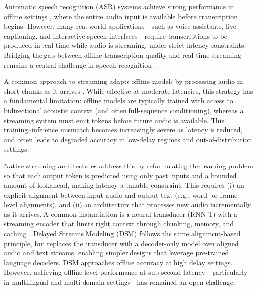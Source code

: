 Automatic speech recognition (ASR) systems achieve strong performance in offline settings \citep{radford2023whisper,liu2025voxtral}, where the entire audio input is available before transcription begins. However, many real-world applications—such as voice assistants, live captioning, and interactive speech interfaces—require transcriptions to be produced in real time while audio is streaming, under strict latency constraints. Bridging the gap between offline transcription quality and real-time streaming remains a central challenge in speech recognition \citep{graves2012rnnt,zeghidour2025streaming}.

A common approach to streaming adapts offline models by processing audio in short chunks as it arrives \citep{machacek2023streaming}. While effective at moderate latencies, this strategy has a fundamental limitation: offline models are typically trained with access to bidirectional acoustic context (and often full-sequence conditioning), whereas a streaming system must emit tokens before future audio is available. This training--inference mismatch becomes increasingly severe as latency is reduced, and often leads to degraded accuracy in low-delay regimes and out-of-distribution settings.

 Native streaming architectures address this by reformulating the learning problem so that each output token is predicted using only past inputs and a bounded amount of lookahead, making latency a tunable constraint. This requires (i) an explicit alignment between input audio and output text (e.g., word- or frame-level alignments), and (ii) an architecture that processes new audio incrementally as it arrives. A common instantiation is a neural transducer (RNN-T) with a streaming encoder that limits right context through chunking, memory, and caching \citep{graves2012rnnt,Shi2020EmformerEM, chen2021developing, noroozi2024nemotron}. Delayed Streams Modeling (DSM) \citep{zeghidour2025streaming} follows the same alignment-based principle, but replaces the transducer with a decoder-only model over aligned audio and text streams, enabling simpler designs that leverage pre-trained language decoders. DSM approaches offline accuracy at high delay settings. However, achieving offline-level performance at sub-second latency—particularly in multilingual and multi-domain settings—has remained an open challenge.

